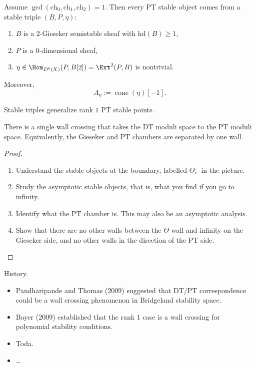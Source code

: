 \documentclass{book}
\begin{document}
\begin{definition}[PT stability]
\label{definition-pt-stability}
\end{definition}

\begin{theorem}
\label{theorem-pt-stable-triple}
Assume $\gcd(\mathrm{ch}_0,
\mathrm{ch}_1,\mathrm{ch}_2)=1$.
Then every PT stable object comes from
a stable triple $(B,P,\eta)$:
\begin{enumerate}
\item $B$ is a 2-Gieseker
      semistable sheaf with
      $\mathrm{hd}(B)\geq 1$,
\item $P$ is a $0$-dimensional sheaf,
\item $\eta \in
      \Hom_{D^b(X)}(P,B[2])=
      \Ext^2(P,B)$ is nontrivial.
\end{enumerate}
Moreover,
$$
A_\eta := \operatorname{cone}(\eta)[-1].
$$
\end{theorem}

\begin{remark}
Stable triples generalize rank $1$
PT stable points.
\end{remark}

\begin{theorem}[Jardim et al.]
\label{theorem-single-wall-crossing}
There is a single wall crossing
that takes the DT moduli space to
the PT moduli space.
Equivalently, the Gieseker and PT
chambers are separated by one wall.
\end{theorem}

\begin{proof}
\begin{enumerate}
\item Understand the stable
objects at the boundary,
labelled $\Theta_v^-$
in the picture.
\item Study the asymptotic stable
objects, that is,
what you find if you go to
infinity.
\item Identify what the PT
chamber is.
This may also be an asymptotic
analysis.
\item Show that there are no other
walls between the $\Theta$ wall
and infinity on the Gieseker side,
and no other walls in the
direction of the PT side.
\end{enumerate}
\end{proof}

\medskip\noindent
History.
\begin{itemize}
\item Pandharipande and Thomas
(2009) suggested that DT/PT
correspondence could be a wall
crossing phenomenon in
Bridgeland stability space.
\item Bayer (2009) established
that the rank $1$ case is a
wall crossing for polynomial
stability conditions.
\item Toda.
\item \dots
\end{itemize}
\end{document}
